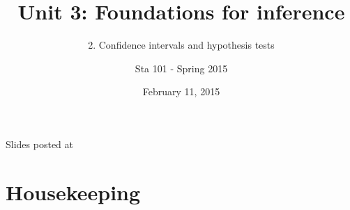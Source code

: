 \documentclass[slidestop,compress,mathserif,12pt,t,professionalfonts,xcolor=table]{beamer}
\title{Unit 3: Foundations for inference}
\subtitle{2. Confidence intervals and hypothesis tests}
\author{Sta 101 - Spring 2015}
\date{February 11, 2015}
\institute{Duke University, Department of Statistical Science}
\begin{document}


\begin{frame}[plain]

\titlepage
\vfill
{\scriptsize {} \hfill Slides posted at  \webLink{\CourseSite}{\CourseSite}}
\addtocounter{framenumber}{-1} 

\end{frame}


\section{Housekeeping}

\end{document}
